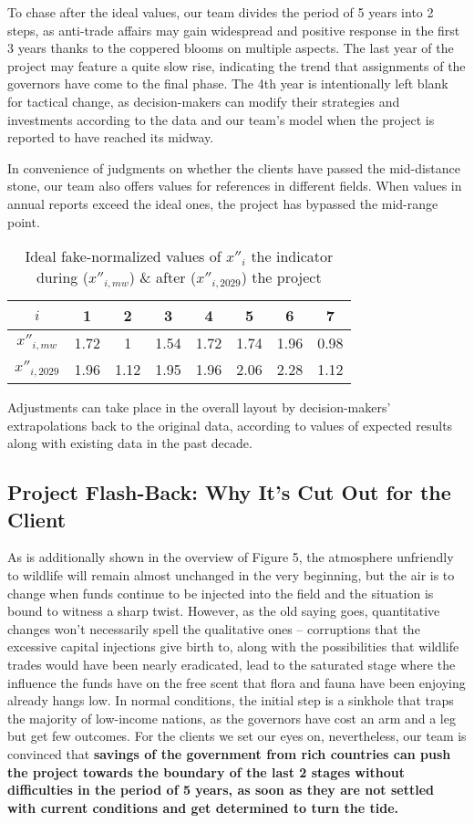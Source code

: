 \documentclass[12pt]{article}
\begin{document}
To chase after the ideal values, our team divides the period of 5 years into 2 steps, as anti-trade affairs may gain widespread and positive response in the first 3 years thanks to the coppered blooms on multiple aspects. The last year of the project may feature a quite slow rise, indicating the trend that assignments of the governors have come to the final phase. The 4th year is intentionally left blank for tactical change, as decision-makers can modify their strategies and investments according to the data and our team's model when the project is reported to have reached its midway.

In convenience of judgments on whether the clients have passed the mid-distance stone, our team also offers values for references in different fields. When values in annual reports exceed the ideal ones, the project has bypassed the mid-range point.

\begin{table}[htbp]
\centering
	\begin{tabular}{c|ccccccc}
		$i$ & 1 & 2 & 3 & 4 & 5 & 6 & 7\\
		\hline
		$x''_{i,mw}$ & 1.72 & 1 & 1.54 & 1.72 & 1.74 & 1.96 & 0.98\\
		$x''_{i,2029}$ & 1.96 &1.12 & 1.95 & 1.96 & 2.06 & 2.28 & 1.12\\
	\end{tabular}
\caption{Ideal fake-normalized values of $x''_i$ the indicator during ($x''_{i,mw}$) \& after ($x''_{i,2029}$) the project}
\end{table}

Adjustments can take place in the overall layout by decision-makers' extrapolations back to the original data, according to values of expected results along with existing data in the past decade.

\subsection{Project Flash-Back: Why It's Cut Out for the Client}


As is additionally shown in the overview of Figure 5, the atmosphere unfriendly to wildlife will remain almost unchanged in the very beginning, but the air is to change when funds continue to be injected into the field and the situation is bound to witness a sharp twist. However, as the old saying goes, quantitative changes won't necessarily spell the qualitative ones -- corruptions that the excessive capital injections give birth to, along with the possibilities that wildlife trades would have been nearly eradicated, lead to the saturated stage where the influence the funds have on the free scent that flora and fauna have been enjoying already hangs low. In normal conditions, the initial step is a sinkhole that traps the majority of low-income nations, as the governors have cost an arm and a leg but get few outcomes. For the clients we set our eyes on, nevertheless, our team is convinced that \textbf{savings of the government from rich countries can push the project towards the boundary of the last 2 stages without difficulties in the period of 5 years, as soon as they are not settled with current conditions and get determined to turn the tide.}
\end{document}
